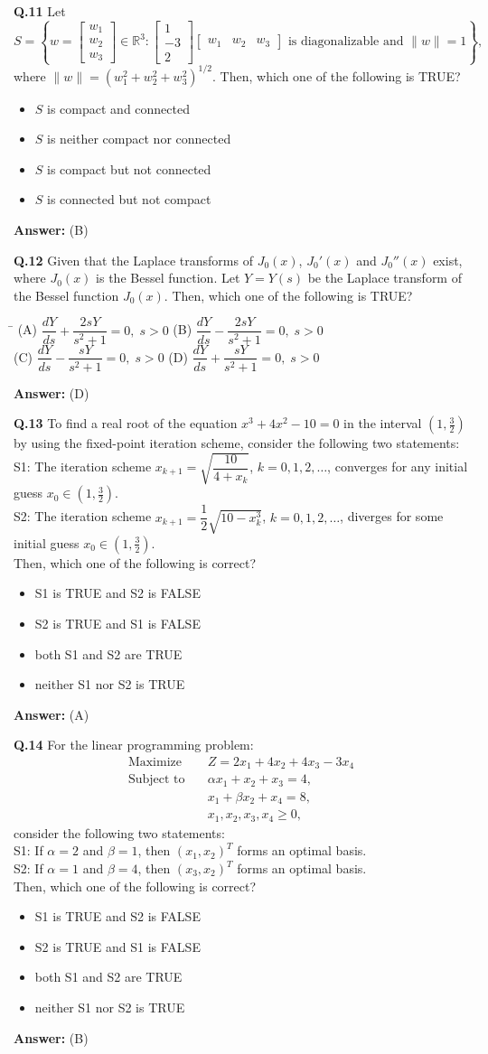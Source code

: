 \documentclass[11pt,a4paper]{article}
\newcommand{\optsfourA}[4]{%
  \begin{tabbing}
    \hspace{0.48\linewidth}\=\kill
    (A) #1 \> (B) #2 \\[2pt]
    (C) #3 \> (D) #4
  \end{tabbing}%
}
\newcommand{\optslistA}[4]{%
  \begin{itemize}
    \setlength{\itemsep}{2pt}\setlength{\parskip}{0pt}
    \item[(A)] #1
    \item[(B)] #2
    \item[(C)] #3
    \item[(D)] #4
  \end{itemize}%
}
\newcommand{\ans}[1]{\textbf{Answer:} #1\par\medskip}
\begin{document}
\textbf{Q.11} Let
\[
  S = \left\{w = \begin{bmatrix} w_1 \\ w_2 \\ w_3 \end{bmatrix} \in \mathbb{R}^3 : \begin{bmatrix} 1 \\ -3 \\ 2 \end{bmatrix} \begin{bmatrix} w_1 & w_2 & w_3 \end{bmatrix} \text{ is diagonalizable and } \|w\| = 1\right\},
\]
where $\|w\| = (w_1^2 + w_2^2 + w_3^2)^{1/2}$. Then, which one of the following is TRUE?
\optslistA{$S$ is compact and connected}{$S$ is neither compact nor connected}{$S$ is compact but not connected}{$S$ is connected but not compact}
\ans{(B)}

\textbf{Q.12} Given that the Laplace transforms of $J_0(x)$, $J_0'(x)$ and $J_0''(x)$ exist, where $J_0(x)$ is the Bessel function. Let $Y = Y(s)$ be the Laplace transform of the Bessel function $J_0(x)$. Then, which one of the following is TRUE?
\optsfourA{$\dfrac{dY}{ds} + \dfrac{2sY}{s^2 + 1} = 0, \; s > 0$}{$\dfrac{dY}{ds} - \dfrac{2sY}{s^2 + 1} = 0, \; s > 0$}{$\dfrac{dY}{ds} - \dfrac{sY}{s^2 + 1} = 0, \; s > 0$}{$\dfrac{dY}{ds} + \dfrac{sY}{s^2 + 1} = 0, \; s > 0$}
\ans{(D)}

\textbf{Q.13} To find a real root of the equation $x^3 + 4x^2 - 10 = 0$ in the interval $(1, \frac{3}{2})$ by using the fixed-point iteration scheme, consider the following two statements:\\
S1: The iteration scheme $x_{k+1} = \sqrt{\dfrac{10}{4 + x_k}}$, $k = 0, 1, 2, \ldots$, converges for any initial guess $x_0 \in (1, \frac{3}{2})$.\\
S2: The iteration scheme $x_{k+1} = \dfrac{1}{2}\sqrt{10 - x_k^3}$, $k = 0, 1, 2, \ldots$, diverges for some initial guess $x_0 \in (1, \frac{3}{2})$.\\
Then, which one of the following is correct?
\optslistA{S1 is TRUE and S2 is FALSE}{S2 is TRUE and S1 is FALSE}{both S1 and S2 are TRUE}{neither S1 nor S2 is TRUE}
\ans{(A)}

\textbf{Q.14} For the linear programming problem:
\begin{align*}
  \text{Maximize} \quad & Z = 2x_1 + 4x_2 + 4x_3 - 3x_4 \\
  \text{Subject to} \quad & \alpha x_1 + x_2 + x_3 = 4, \\
  & x_1 + \beta x_2 + x_4 = 8, \\
  & x_1, x_2, x_3, x_4 \ge 0,
\end{align*}
consider the following two statements:\\
S1: If $\alpha = 2$ and $\beta = 1$, then $(x_1, x_2)^T$ forms an optimal basis.\\
S2: If $\alpha = 1$ and $\beta = 4$, then $(x_3, x_2)^T$ forms an optimal basis.\\
Then, which one of the following is correct?
\optslistA{S1 is TRUE and S2 is FALSE}{S2 is TRUE and S1 is FALSE}{both S1 and S2 are TRUE}{neither S1 nor S2 is TRUE}
\ans{(B)}
\end{document}
